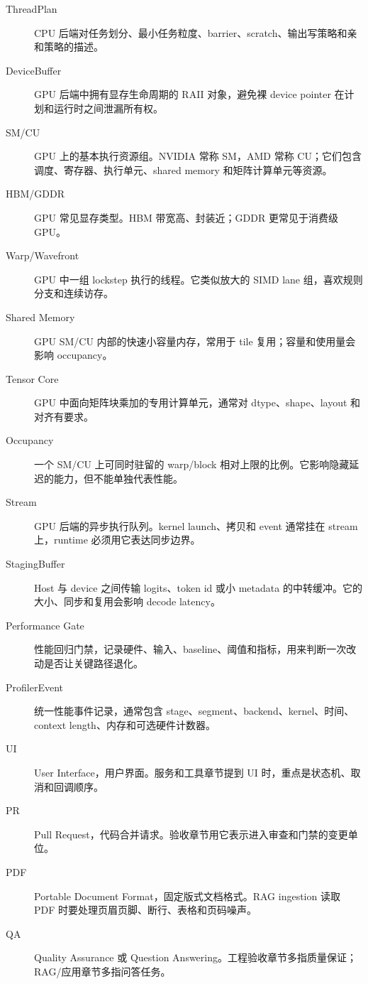 \begin{description}
  \item[ThreadPlan] CPU 后端对任务划分、最小任务粒度、barrier、scratch、输出写策略和亲和策略的描述。
  \item[DeviceBuffer] GPU 后端中拥有显存生命周期的 RAII 对象，避免裸 device pointer 在计划和运行时之间泄漏所有权。
  \item[SM/CU] GPU 上的基本执行资源组。NVIDIA 常称 SM，AMD 常称 CU；它们包含调度、寄存器、执行单元、shared memory 和矩阵计算单元等资源。
  \item[HBM/GDDR] GPU 常见显存类型。HBM 带宽高、封装近；GDDR 更常见于消费级 GPU。
  \item[Warp/Wavefront] GPU 中一组 lockstep 执行的线程。它类似放大的 SIMD lane 组，喜欢规则分支和连续访存。
  \item[Shared Memory] GPU SM/CU 内部的快速小容量内存，常用于 tile 复用；容量和使用量会影响 occupancy。
  \item[Tensor Core] GPU 中面向矩阵块乘加的专用计算单元，通常对 dtype、shape、layout 和对齐有要求。
  \item[Occupancy] 一个 SM/CU 上可同时驻留的 warp/block 相对上限的比例。它影响隐藏延迟的能力，但不能单独代表性能。
  \item[Stream] GPU 后端的异步执行队列。kernel launch、拷贝和 event 通常挂在 stream 上，runtime 必须用它表达同步边界。
  \item[StagingBuffer] Host 与 device 之间传输 logits、token id 或小 metadata 的中转缓冲。它的大小、同步和复用会影响 decode latency。
  \item[Performance Gate] 性能回归门禁，记录硬件、输入、baseline、阈值和指标，用来判断一次改动是否让关键路径退化。
  \item[ProfilerEvent] 统一性能事件记录，通常包含 stage、segment、backend、kernel、时间、context length、内存和可选硬件计数器。
  \item[UI] User Interface，用户界面。服务和工具章节提到 UI 时，重点是状态机、取消和回调顺序。
  \item[PR] Pull Request，代码合并请求。验收章节用它表示进入审查和门禁的变更单位。
  \item[PDF] Portable Document Format，固定版式文档格式。RAG ingestion 读取 PDF 时要处理页眉页脚、断行、表格和页码噪声。
  \item[QA] Quality Assurance 或 Question Answering。工程验收章节多指质量保证；RAG/应用章节多指问答任务。
\end{description}
